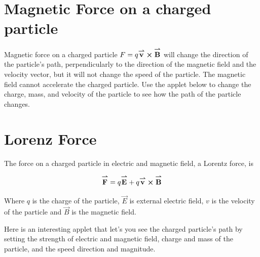 \documentclass{ximera}
\begin{document}
\section{Magnetic Force on a charged particle}

Magnetic force on a charged particle $F=q {\overset{\boldsymbol{\rightharpoonup}}{\mathbf{v}}}\hspace{0in} \boldsymbol\times {\overset{\boldsymbol{\rightharpoonup}}{\mathbf{B}}}\hspace{0in}$ will change the direction of the particle's path, perpendicularly to the direction of the magnetic field and the velocity vector, but it will not change the speed of the particle. The magnetic field cannot accelerate the charged particle. Use the applet below to change the charge, mass, and velocity of the particle to see how the path of the particle changes.





\section{Lorenz Force}

The force on a charged particle in electric and magnetic field, a Lorentz force, is  

\begin{equation}
{\overset{\boldsymbol{\rightharpoonup}}{\mathbf{F}}}\hspace{0in}=q{\overset{\boldsymbol{\rightharpoonup}}{\mathbf{E}}}\hspace{0in} + q {\overset{\boldsymbol{\rightharpoonup}}{\mathbf{v}}}\hspace{0in} \boldsymbol\times {\overset{\boldsymbol{\rightharpoonup}}{\mathbf{B}}}\hspace{0in}
\end{equation}

Where $q$ is the charge of the particle, $\vec{E}$ is external electric field, $v$ is the velocity of the particle and $\vec{B}$ is the magnetic field.


Here is an interesting applet that let's you see the charged particle's path by setting the strength of electric and magnetic field, charge and mass of the particle, and the speed direction and magnitude.


\end{document}
